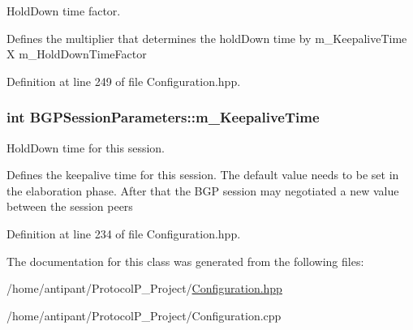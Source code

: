 Hold\-Down time factor. 

Defines the multiplier that determines the hold\-Down time by m\-\_\-\-Keepalive\-Time X m\-\_\-\-Hold\-Down\-Time\-Factor 

Definition at line 249 of file Configuration.\-hpp.

\hypertarget{classBGPSessionParameters_a465c4710f73834f9d0daaf9defe6ccc8}{
\subsubsection[{m\-\_\-\-Keepalive\-Time}]{\setlength{\rightskip}{0pt plus 5cm}int B\-G\-P\-Session\-Parameters\-::m\-\_\-\-Keepalive\-Time\hspace{0.3cm}{\ttfamily [protected]}}}\label{classBGPSessionParameters_a465c4710f73834f9d0daaf9defe6ccc8}


Hold\-Down time for this session. 

Defines the keepalive time for this session. The default value needs to be set in the elaboration phase. After that the B\-G\-P session may negotiated a new value between the session peers 

Definition at line 234 of file Configuration.\-hpp.



The documentation for this class was generated from the following files\-:\begin{DoxyCompactItemize}
\item 
/home/antipant/\-Protocol\-P\-\_\-\-Project/\hyperlink{Configuration_8hpp}{Configuration.\-hpp}\item 
/home/antipant/\-Protocol\-P\-\_\-\-Project/Configuration.\-cpp\end{DoxyCompactItemize}
